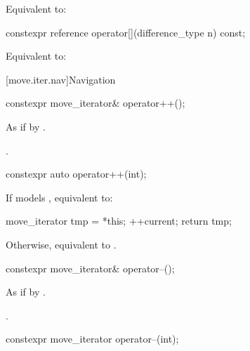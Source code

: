 \begin{itemdescr}
\pnum
\effects
Equivalent to: 
\end{itemdescr}

%
\begin{itemdecl}
constexpr reference operator[](difference_type n) const;
\end{itemdecl}

\begin{itemdescr}
\pnum
\effects
Equivalent to: 
\end{itemdescr}

[move.iter.nav]{Navigation}

%
\begin{itemdecl}
constexpr move_iterator& operator++();
\end{itemdecl}

\begin{itemdescr}
\pnum
\effects
As if by .

\pnum
\returns
{}.
\end{itemdescr}

%
\begin{itemdecl}
constexpr auto operator++(int);
\end{itemdecl}

\begin{itemdescr}
\pnum
\effects
If  models , equivalent to:
\begin{codeblock}
move_iterator tmp = *this;
++current;
return tmp;
\end{codeblock}
Otherwise, equivalent to .
\end{itemdescr}

%
\begin{itemdecl}
constexpr move_iterator& operator--();
\end{itemdecl}

\begin{itemdescr}
\pnum
\effects
As if by .

\pnum
\returns
{}.
\end{itemdescr}

%
\begin{itemdecl}
constexpr move_iterator operator--(int);
\end{itemdecl}

